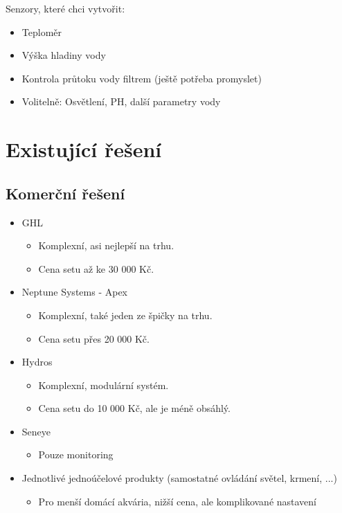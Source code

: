 \documentclass{customarticle}
\begin{document}
	Senzory, které chci vytvořit:
	\begin{itemize}
		\item Teploměr
		\item Výška hladiny vody
		\item Kontrola průtoku vody filtrem (ještě potřeba promyslet)
		\item Volitelně: Osvětlení, PH, další parametry vody
	\end{itemize}


	\section*{Existující řešení}
	\subsection*{Komerční řešení}
	\begin{itemize}
		\item GHL
		\begin{itemize}
			\item Komplexní, asi nejlepší na trhu.
			\item Cena setu až ke 30 000 Kč.
		\end{itemize}

		\item Neptune Systems - Apex
		\begin{itemize}
			\item Komplexní, také jeden ze špičky na trhu.
			\item Cena setu přes 20 000 Kč.
		\end{itemize}
		
		\item Hydros
		\begin{itemize}
			\item Komplexní, modulární systém.
			\item Cena setu do 10 000 Kč, ale je méně obsáhlý.
		\end{itemize}

		\item Seneye
		\begin{itemize}
			\item Pouze monitoring
		\end{itemize}

		\item Jednotlivé jednoúčelové produkty (samostatné ovládání světel, krmení, ...)
		\begin{itemize}
			\item Pro menší domácí akvária, nižší cena, ale komplikované nastavení 
		\end{itemize}
	\end{itemize}
	
\end{document}
